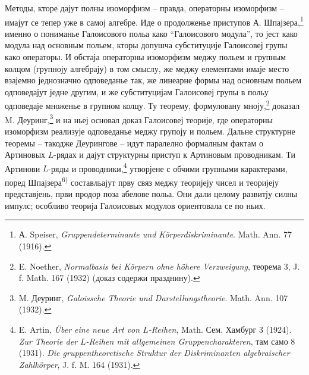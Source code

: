 ﻿\documentclass[11pt]{article}
\newcommand{\foreign}[1]{#1}
\begin{document}
Методы, кторе дајут полны изоморфизм -- правда, операторны изоморфизм -- имајут се тепер уже в самој алгебре. Иде о продолженье приступов А. Шпајзера,\footnote{А. Speiser, \foreign{\emph{Gruppendeterminante und Körperdiskriminante}}. Math. Ann. 77 (1916).} именно о пониманье Галоисового польа како ``Галоисового модула'', то јест како модула над основным польем, кторы допушча субституције Галоисовеј групы како операторы. И обстаја операторны изоморфизм меджу польем и групным колцом (групноју алгебрају) в том смыслу, же меджу елементами имаје место взајемно једнозначно одповеданье так, же линеарне формы над основным польем одповедајут једне другим, и же субституцијам Галоисовеј групы в польу одповедаје множенье в групном колцу. Ту теорему, формуловану мноју,\footnote{E. Noether, \foreign{\emph{Normalbasis bei Körpern ohne höhere Verzweigung}}, теорема 3, J. f. Math. 167 (1932) (доказ содержи празднину).} доказал M. Деуринг,\footnote{M. Деуринг, \foreign{\emph{Galoissche Theorie und Darstellungstheorie}}. Math. Ann. 107 (1932).} и на ньеј основал доказ Галоисовеј теорије, где операторны изоморфизм реализује одповеданье меджу групоју и польем. Дальне структурне теоремы -- такодже Деурингове -- идут паралелно формалным фактам о Артиновых \(L\)-рядах и дајут структурны приступ к Артиновым проводникам. Ти Артинови \(L\)-ряды и проводники,\footnote{E. Artin, \foreign{\emph{Über eine neue Art von \(L\)-Reihen}}, Math. Сем. Хамбург 3 (1924). \foreign{\emph{Zur Theorie der \(L\)-Reihen mit allgemeinen Gruppencharakteren}}, там само 8 (1931). \foreign{\emph{Die gruppentheoretische Struktur der Diskriminanten algebraischer Zahlkörper}}, J. f. M. 164 (1931).} утворјене с обчими групными карактерами, поред Шпајзера\textsuperscript{6)} составльајут прву связ меджу теоријеју чисел и теоријеју представјень, први продор поза абелове польа. Они дали целому развитју силны импулс; особливо теорија Галоисовых модулов ориентовала се по ньих.
\end{document}
